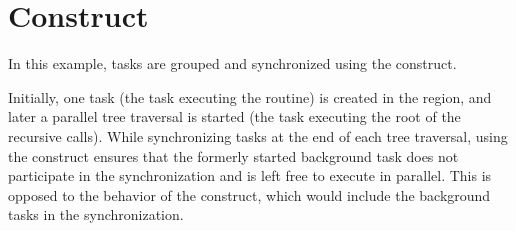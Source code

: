 \section{ Construct}
\label{sec:taskgroup}

In this example, tasks are grouped and synchronized using the  
construct.

Initially, one task (the task executing the  
routine) is created in the  region, and later a parallel tree traversal 
is started (the task executing the root of the recursive  
calls). While synchronizing tasks at the end of each tree traversal, using the 
 construct ensures that the formerly started background task 
does not participate in the synchronization and is left free to execute in parallel. 
This is opposed to the behavior of the  construct, which would 
include the background tasks in the synchronization.



